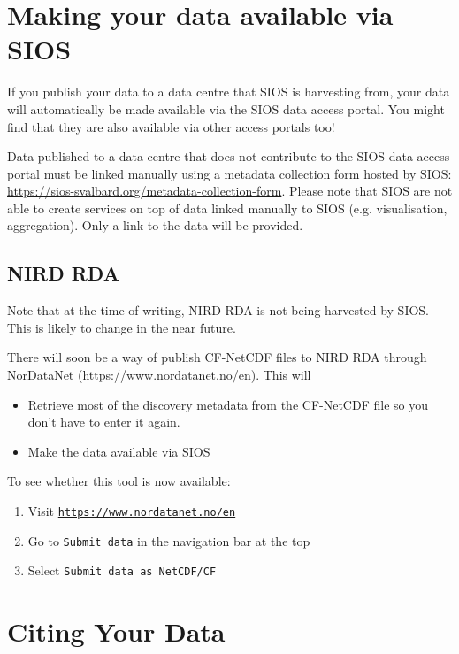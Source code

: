 \documentclass[a4paper,12pt]{article}
\begin{document}
\section{Making your data available via SIOS}
\label{sec: linking data to sios}

If you publish your data to a data centre that SIOS is harvesting from, your data will automatically be made available via the SIOS data access portal. You might find that they are also available via other access portals too!
 
Data published to a data centre that does not contribute to the SIOS data access portal must be linked manually using a metadata collection form hosted by SIOS: \url{https://sios-svalbard.org/metadata-collection-form}. Please note that SIOS are not able to create services on top of data linked manually to SIOS (e.g. visualisation, aggregation). Only a link to the data will be provided. 

\subsection{NIRD RDA}

Note that at the time of writing, NIRD RDA is not being harvested by SIOS. This is likely to change in the near future. 

There will soon be a way of publish CF-NetCDF files to NIRD RDA through NorDataNet (\url{https://www.nordatanet.no/en}). This will
\begin{itemize}
\item Retrieve most of the discovery metadata from the CF-NetCDF file so you don't have to enter it again.
\item Make the data available via SIOS
\end{itemize}

To see whether this tool is now available: 

\begin{enumerate}[label=\arabic*.]
    \item Visit \href{https://www.nordatanet.no/en}{\texttt{https://www.nordatanet.no/en}}
    \item Go to \texttt{Submit data} in the navigation bar at the top
    \item Select \texttt{Submit data as NetCDF/CF}
\end{enumerate}

\section{Citing Your Data}
\end{document}
